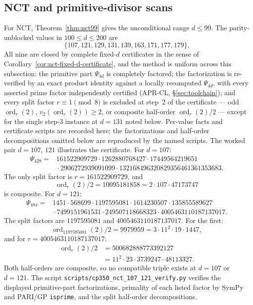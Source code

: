 \documentclass[11pt]{amsart}
\theoremstyle{plain}
\theoremstyle{definition}
\theoremstyle{remark}
\numberwithin{equation}{section}
\newcommand{\ord}{\operatorname{ord}}
\begin{document}
\subsection{NCT and primitive-divisor scans}\label{sec:primdiv-survey}\label{sec:nct-verify}

For NCT, Theorem~\ref{thm:nct99} gives the unconditional range $d\leq99$. The parity-unblocked values in $100\leq d\leq200$ are
\[
  \{107,121,129,131,139,163,171,177,179\}.
\]
All nine are closed by complete fixed-$d$ certificates in the sense of Corollary~\ref{cor:nct-fixed-d-certificate}, and the method is uniform across this subsection: the primitive part $\Psi_{4d}$ is completely factored; the factorization is re-verified by an exact product identity against a locally recomputed $\Psi_{4d}$, with every asserted prime factor independently certified (APR-CL, \S\ref{sec:toolchain}); and every split factor $r \equiv 1 \pmod 8$ is excluded at step~2 of the certificate --- odd $\ord_r(2)$, $v_2(\ord_r(2)) \geq 2$, or composite half-order $\ord_r(2)/2$ --- except for the single step-3 instance at $d = 131$ noted below. Per-value facts and certificate scripts are recorded here; the factorizations and half-order decompositions omitted below are reproduced by the named scripts. The worked pair $d = 107$, $121$ illustrates the certificate. For $d=107$:
\[
\begin{aligned}
  \Psi_{428}={}&
  161522909729\cdot1262880768427\cdot17449564219651\\
  &{}\cdot2906272939091099\cdot132168496320829356461361353683.
\end{aligned}
\]
The only split factor is $r=161522909729$, and
\[
  \ord_r(2)/2=10095181858
  =2\cdot107\cdot47173747
\]
is composite. For $d=121$:
\[
\begin{aligned}
  \Psi_{484}={}&
  1451\cdot568699\cdot1197595081\cdot1614230507
  \cdot135855589627\\
  &{}\cdot7499151961531\cdot249507118668323
  \cdot4005463110187137017.
\end{aligned}
\]
The split factors are $1197595081$ and $4005463110187137017$. For the first:
\[
  \ord_{1197595081}(2)/2
  =9979959=3\cdot11^2\cdot19\cdot1447,
\]
and for $r=4005463110187137017$:
\[
\begin{aligned}
  \ord_r(2)/2
  &=500682888773392127\\
  &=11^2\cdot23\cdot3739247\cdot48113327.
\end{aligned}
\]
Both half-orders are composite, so no compatible triple exists at $d=107$ or $d=121$. The script \texttt{scripts/cp350\_nct\_107\_121\_verify.py} verifies the displayed primitive-part factorizations, primality of each listed factor by SymPy and PARI/GP \texttt{isprime}, and the split half-order decompositions.
\end{document}
